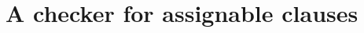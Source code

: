 \documentclass[a4paper]{llncs}
\newcommand{\jml}{\textsc{Jml}}
\newcommand{\modtool}{\texttt{assignable:tool}}
\begin{document}
\section{A checker for assignable clauses}
\label{sec-che-for-ass-cla}
\end{document}

